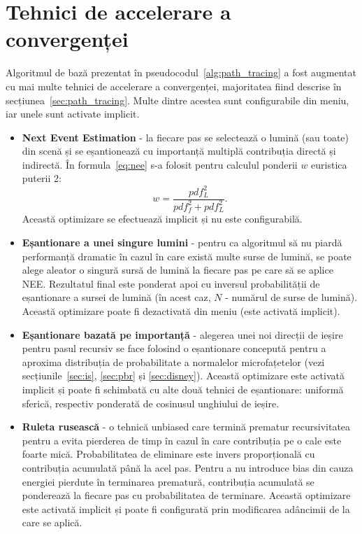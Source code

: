 \documentclass[12pt,a4paper]{report}
\numberwithin{equation}{section} %
\begin{document}
\section{Tehnici de accelerare a convergenței}\label{sec:options}
Algoritmul de bază prezentat în pseudocodul~\ref{alg:path_tracing} a fost
augmentat cu mai multe tehnici de accelerare a convergenței, majoritatea fiind
descrise în secțiunea~\ref{sec:path_tracing}. Multe dintre acestea sunt configurabile
din meniu, iar unele sunt activate implicit.
\begin{itemize}
	\item \textbf{Next Event Estimation} - la fiecare pas se selectează o lumină (sau toate)
	      din scenă și se eșantionează cu importanță multiplă contribuția directă și indirectă.
	      În formula~\ref{eq:nee} s-a folosit pentru calculul ponderii $w$ euristica puterii 2:
	      \begin{equation}
		      w = \dfrac{pdf_L^2}{pdf_f^2 + pdf_L^2}.
	      \end{equation}
	      Această optimizare se efectuează implicit și nu este configurabilă.
	\item \textbf{Eșantionare a unei singure lumini} - pentru ca algoritmul să nu piardă
	      performanță dramatic în cazul în care există multe surse de lumină, se poate alege
	      aleator o singură sursă de lumină la fiecare pas pe care să se aplice NEE. Rezultatul
	      final este ponderat apoi cu inversul probabilității de eșantionare a sursei de lumină (în acest
	      caz, $N$ - numărul de surse de lumină). Această optimizare poate
	      fi dezactivată din meniu (este activată implicit).
	\item \textbf{Eșantionare bazată pe importanță} - alegerea unei noi direcții de ieșire
	      pentru pasul recursiv se face folosind o eșantionare concepută pentru a aproxima
	      distribuția de probabilitate a normalelor microfațetelor (vezi secțiunile~\ref{sec:is}, \ref{sec:pbr} și \ref{sec:disney}).
	      Această optimizare este activată implicit și poate fi schimbată cu alte două
	      tehnici de eșantionare: uniformă sferică, respectiv ponderată de cosinusul unghiului
	      de ieșire.
	\item \textbf{Ruleta rusească} - o tehnică unbiased care termină prematur
	      recursivitatea pentru a evita pierderea de timp în cazul în care contribuția pe o cale
	      este foarte mică. Probabilitatea de eliminare este invers proporțională cu
	      contribuția acumulată până la acel pas. Pentru a nu introduce bias din cauza
	      energiei pierdute în terminarea prematură, contribuția acumulată se
	      ponderează la fiecare pas cu probabilitatea de terminare.
	      Această optimizare este activată implicit și poate fi configurată
	      prin modificarea adâncimii de la care se aplică.
\end{itemize}
\end{document}
